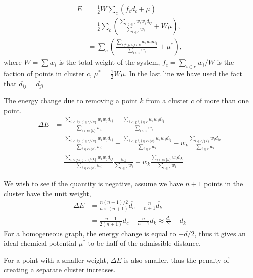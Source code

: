 \documentclass{article}
\begin{document}
\begin{align*}
E &= \frac12 W \sum_c (f_c \overline d_c + \mu) \\
  &= \frac12 \sum_c \left(
              \frac{\sum_{i, j \in c} w_i w_j d_{i j} }
             {\sum_{i\in c} w_i} + W \mu
             \right), \\
  &= \sum_c \left(
            \frac{\sum_{i \ne j, i, j \in c} w_i w_j d_{i j} }
             {\sum_{i\in c} w_i} + \mu^*
             \right),
\end{align*}
where $W = \sum w_i$ is the total weight of the system,
$f_c = \sum_{i \in c} w_i / W $ is the faction of points in cluster $c$,
$\mu^* = \frac12 W \mu$.
In the last line we have used the fact that $d_{ij} = d_{ji}$


The energy change due to removing a point $k$ from a cluster $c$ of more than one point.
\begin{align*}
\Delta E &=
 \frac{\sum_{i < j; i, j \in c/\{k\}} w_i w_j d_{i j} }
             {\sum_{i \in c/\{k\}} w_i}
-
 \frac{\sum_{i < j; i, j \in c} w_i w_j d_{i j} }
             {\sum_{i \in c} w_i} \\
&=
 \frac{\sum_{i < j; i, j \in c/\{k\}} w_i w_j d_{i j} }
             {\sum_{i \in c/\{k\}} w_i}
-
 \frac{\sum_{i < j; i, j \in c/\{k\}} w_i w_j d_{i j}}
             {\sum_{i \in c} w_i}
-
 w_k \frac{\sum_{i \in c/\{k\}} w_i d_{i k}}
             {\sum_{i \in c} w_i} \\
&=
 \frac{ \sum_{i < j; i, j \in c/\{k\}} w_i w_j d_{i j} }
             { \sum_{i \in c/\{k\}} w_i }
 \frac{w_k} { \sum_{i \in c} w_i}
-
 w_k \frac{\sum_{i \in c/\{k\}} w_i d_{i k}}
             {\sum_{i \in c} w_i}
\end{align*}

We wish to see if the quantity is negative, assume we have $n+1$ points in the cluster have the unit weight,
\begin{align*}
\Delta E
&= \frac {n(n-1)/2}{n\times (n+1)} \overline {d_c}
         - \frac {n}{n+1}\overline {d_k} \\
&= \frac{n-1}{2(n+1)} \overline {d_c}
 - \frac{n}{n+1} \overline {d_k}
\approx \frac { \overline {d_c} }{2}
 - \overline d_k
\end{align*}
For a homogeneous graph, the energy change is equal to $-\overline d/2$,
thus it gives an ideal chemical potential $\mu^*$ to be half of the admissible
distance.

For a point with a smaller weight, $\Delta E$ is also smaller,
thus the penalty of creating a separate cluster increases.
\end{document}

